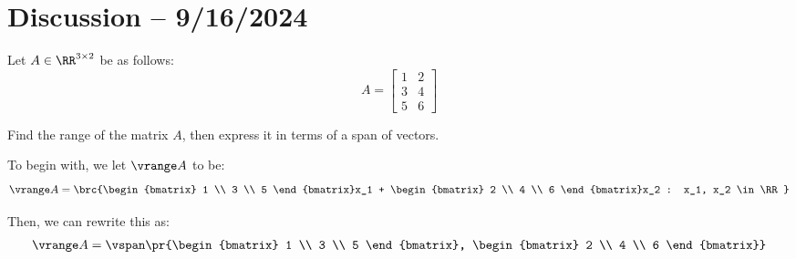 \documentclass[openany]{book}
\begin{document}
\section{Discussion -- 9/16/2024}
\begin{hw}
	Let $A \in \RR^{3 \times 2}$ be as follows:
	\begin{equation*}
		A = \begin{bmatrix}
			 1 & 2 \\ 3 & 4 \\ 5 & 6
		\end{bmatrix}
	\end{equation*}

	Find the range of the matrix $A$, then express it in terms of a span of vectors.
\end{hw}
\begin{solution}
	To begin with, we let $\vrange A$ to be:
	\begin{equation*}
		\vrange A = \brc{\begin{bmatrix}
				1 \\ 3 \\ 5
		\end{bmatrix}x_1 + \begin{bmatrix}
		2 \\ 4 \\ 6
	\end{bmatrix}x_2 : x_1, x_2 \in \RR}
	\end{equation*}

	Then, we can rewrite this as:
	\begin{align*}
		\vrange A = \vspan\pr{\begin{bmatrix}
				1 \\ 3 \\ 5
		\end{bmatrix}, \begin{bmatrix}
		2 \\ 4 \\ 6
	\end{bmatrix}}
	\end{align*}
\end{solution}
\end{document}
